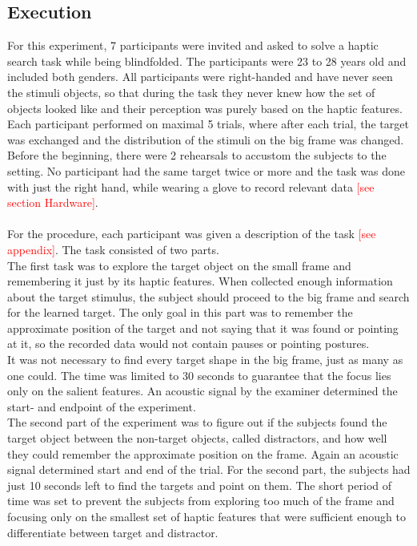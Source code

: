 \subsection{Execution}  
For this experiment, 7 participants were invited and asked to solve a haptic search task while being blindfolded. The participants were 23 to 28 years old and included both genders. All participants were right-handed and have never seen the stimuli objects, so that during the task they never knew how the set of objects looked like and their perception was purely based on the haptic features.\\
Each participant performed on maximal 5 trials, where after each trial, the target was exchanged and the distribution of the stimuli on the big frame was changed. Before the beginning, there were 2 rehearsals to accustom the subjects to the setting. No participant had the same target twice or more and the task was done with just the right hand, while wearing a glove to record relevant data \textcolor{red}{[see section Hardware]}.\\
\\
For the procedure, each participant was given a description of the task \textcolor{red}{[see appendix]}. The task consisted of two parts. \\
The first task was to explore the target object on the small frame and remembering it just by its haptic features. When collected enough information about the target stimulus, the subject should proceed to the big frame and search for the learned target. The only goal in this part was to remember the approximate position of the target and not saying that it was found or pointing at it, so the recorded data would not contain pauses or pointing postures.\\
It was not necessary to find every target shape in the big frame, just as many as one could. The time was limited to 30 seconds to guarantee that the focus lies only on the salient features. An acoustic signal by the examiner determined the start- and endpoint of the experiment.\\
The second part of the experiment was to figure out if the subjects found the target object between the non-target objects, called distractors, and how well they could remember the approximate position on the frame. Again an acoustic signal determined start and end of the trial. For the second part, the subjects had just 10 seconds left to find the targets and point on them. The short period of time was set to prevent the subjects from exploring too much of the frame and focusing only on the smallest set of haptic features that were sufficient enough to differentiate between target and distractor.\\

